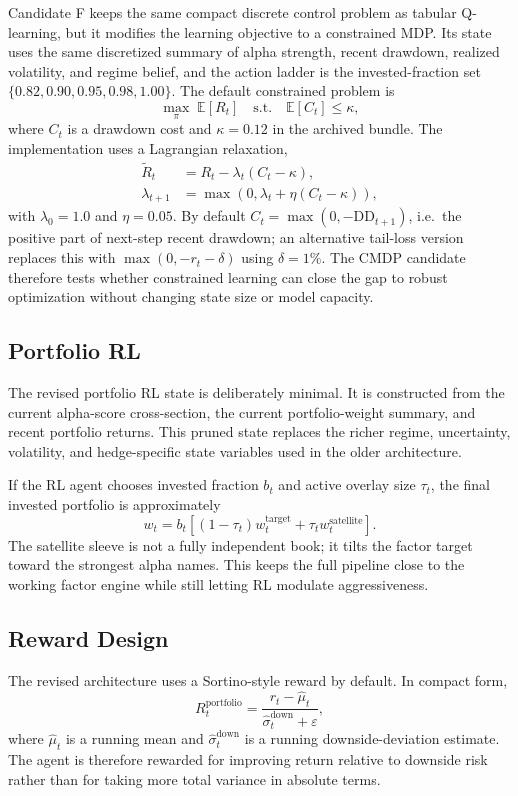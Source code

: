 \documentclass[10pt,twocolumn]{article}
\begin{document}
Candidate F keeps the same compact discrete control problem as tabular
Q-learning, but it modifies the learning objective to a constrained MDP. Its
state uses the same discretized summary of alpha strength, recent drawdown,
realized volatility, and regime belief, and the action ladder is the
invested-fraction set $\{0.82, 0.90, 0.95, 0.98, 1.00\}$. The default
constrained problem is
\[
\max_{\pi}\; \mathbb{E}[R_t]
\quad \text{s.t.} \quad
\mathbb{E}[C_t] \le \kappa,
\]
where $C_t$ is a drawdown cost and $\kappa=0.12$ in the archived bundle. The
implementation uses a Lagrangian relaxation,
\begin{align*}
\tilde R_t &= R_t - \lambda_t(C_t-\kappa), \\
\lambda_{t+1} &= \max(0,\lambda_t + \eta(C_t-\kappa)),
\end{align*}
with $\lambda_0=1.0$ and $\eta=0.05$. By default
$C_t = \max(0,-\mathrm{DD}_{t+1})$, i.e.\ the positive part of next-step recent
drawdown; an alternative tail-loss version replaces this with
$\max(0,-r_t-\delta)$ using $\delta=1\%$. The CMDP candidate therefore tests
whether constrained learning can close the gap to robust optimization without
changing state size or model capacity.

\subsection{Portfolio RL}

The revised portfolio RL state is deliberately minimal. It is constructed from
the current alpha-score cross-section, the current portfolio-weight summary, and
recent portfolio returns. This pruned state replaces the richer regime,
uncertainty, volatility, and hedge-specific state variables used in the older
architecture.

If the RL agent chooses invested fraction $b_t$ and active overlay size $\tau_t$,
the final invested portfolio is approximately
\[
w_t =
b_t \left[(1-\tau_t)w_t^{\text{target}} + \tau_t w_t^{\text{satellite}}\right].
\]
The satellite sleeve is not a fully independent book; it tilts the factor target
toward the strongest alpha names. This keeps the full pipeline close to the
working factor engine while still letting RL modulate aggressiveness.

\subsection{Reward Design}

The revised architecture uses a Sortino-style reward by default. In compact
form,
\[
R_t^{\mathrm{portfolio}}
= \frac{r_t - \hat{\mu}_t}{\hat{\sigma}^{\mathrm{down}}_t + \varepsilon},
\]
where $\hat{\mu}_t$ is a running mean and
$\hat{\sigma}^{\mathrm{down}}_t$ is a running downside-deviation estimate. The
agent is therefore rewarded for improving return relative to downside risk
rather than for taking more total variance in absolute terms.
\end{document}
